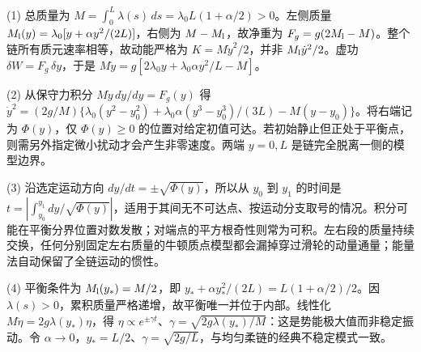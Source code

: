 (1) 总质量为 \(M=\int_0^L\lambda(s)\,ds=\lambda_0L(1+\alpha/2)>0\)。左侧质量 \(M_{\rm l}(y)=\lambda_0[y+\alpha y^2/(2L)]\)，右侧为 \(M-M_{\rm l}\)，故净重为 \(F_g=g(2M_{\rm l}-M)\)。整个链所有质元速率相等，故动能严格为 \(K=M\dot y^2/2\)，并非 \(M_{\rm l}\dot y^2/2\)。虚功 \(\delta W=F_g\,\delta y\)，于是 \(M\ddot y=g[2\lambda_0y+\lambda_0\alpha y^2/L-M]\)。

(2) 从保守力积分 \(M\dot y\,d\dot y/dy=F_g(y)\) 得 \(\dot y^2=(2g/M)\{\lambda_0(y^2-y_0^2)+\lambda_0\alpha(y^3-y_0^3)/(3L)-M(y-y_0)\}\)。将右端记为 \(\Phi(y)\)，仅 \(\Phi(y)\ge0\) 的位置对给定初值可达。若初始静止但正处于平衡点，则需另外指定微小扰动才会产生非零速度。两端 \(y=0,L\) 是链完全脱离一侧的模型边界。

(3) 沿选定运动方向 \(dy/dt=\pm\sqrt{\Phi(y)}\)，所以从 \(y_0\) 到 \(y_1\) 的时间是 \(t=\left|\int_{y_0}^{y_1}dy/\sqrt{\Phi(y)}\right|\)，适用于其间无不可达点、按运动分支取号的情况。积分可能在平衡分界位置对数发散；对端点的平方根奇性则常为可积。左右段的质量持续交换，任何分别固定左右质量的牛顿质点模型都会漏掉穿过滑轮的动量通量；能量法自动保留了全链运动的惯性。

(4) 平衡条件为 \(M_{\rm l}(y_*)=M/2\)，即 \(y_*+\alpha y_*^2/(2L)=L(1+\alpha/2)/2\)。因 \(\lambda(s)>0\)，累积质量严格递增，故平衡唯一并位于内部。线性化 \(M\ddot{\eta}=2g\lambda(y_*)\eta\)，得 \(\eta\propto e^{\pm\gamma t}\)、\(\gamma=\sqrt{2g\lambda(y_*)/M}\)：这是势能极大值而非稳定振动。令 \(\alpha\to0\)，\(y_*=L/2\)、\(\gamma=\sqrt{2g/L}\)，与均匀柔链的经典不稳定模式一致。
